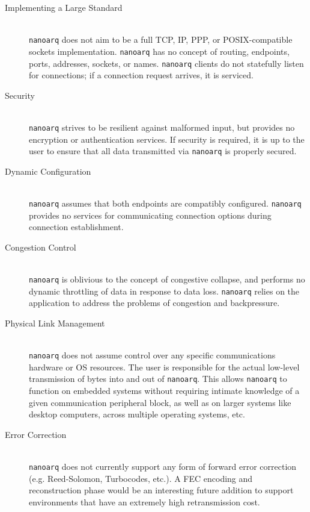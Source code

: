 \documentclass[11pt]{article}
\newcommand{\nanoarq}{\texttt{nanoarq}}
\begin{document}
\begin{description}
\item[Implementing a Large Standard] \hfill \\
    \nanoarq{} does not aim to be a full TCP, IP, PPP, or POSIX-compatible sockets implementation. \nanoarq{} has no concept of routing, endpoints, ports, addresses, sockets, or names. \nanoarq{} clients do not statefully listen for connections; if a connection request arrives, it is serviced.
\item[Security] \hfill \\
    \nanoarq{} strives to be resilient against malformed input, but provides no encryption or authentication services. If security is required, it is up to the user to ensure that all data transmitted via \nanoarq{} is properly secured.
\item[Dynamic Configuration] \hfill \\
    \nanoarq{} assumes that both endpoints are compatibly configured. \nanoarq{} provides no services for communicating connection options during connection establishment.
\item[Congestion Control] \hfill \\
    \nanoarq{} is oblivious to the concept of congestive collapse, and performs no dynamic throttling of data in response to data loss. \nanoarq{} relies on the application to address the problems of congestion and backpressure.
\item[Physical Link Management] \hfill \\
    \nanoarq{} does not assume control over any specific communications hardware or OS resources. The user is responsible for the actual low-level transmission of bytes into and out of \nanoarq{}. This allows \nanoarq{} to function on embedded systems without requiring intimate knowledge of a given communication peripheral block, as well as on larger systems like desktop computers, across multiple operating systems, etc.
\item[Error Correction] \hfill \\
    \nanoarq{} does not currently support any form of forward error correction (e.g. Reed-Solomon, Turbocodes, etc.). A FEC encoding and reconstruction phase would be an interesting future addition to support environments that have an extremely high retransmission cost.
\end{description}
\end{document}

